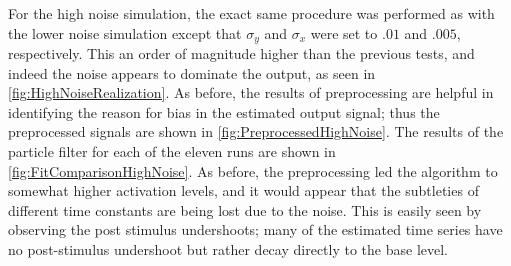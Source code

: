 For the high noise simulation, the exact same procedure was performed as with the lower
noise simulation except that $\sigma_y$ and $\sigma_x$ were set to $.01$ and $.005$,
respectively. This an order of magnitude higher than the previous tests, and indeed the
noise appears to dominate the output, as seen in \autoref{fig:HighNoiseRealization}.  
As before, the results of preprocessing are helpful in identifying the reason for
bias in the estimated output signal; thus the preprocessed signals are shown in 
\autoref{fig:PreprocessedHighNoise}. The results of the particle filter
for each of the eleven runs are shown in \autoref{fig:FitComparisonHighNoise}. 
As before, the preprocessing led the algorithm
to somewhat higher activation levels, and it would appear that the subtleties of
different time constants are being lost due to the noise. This is easily seen
by observing the post stimulus undershoots; many of the estimated time series
have no post-stimulus undershoot but rather decay directly to the base level.

